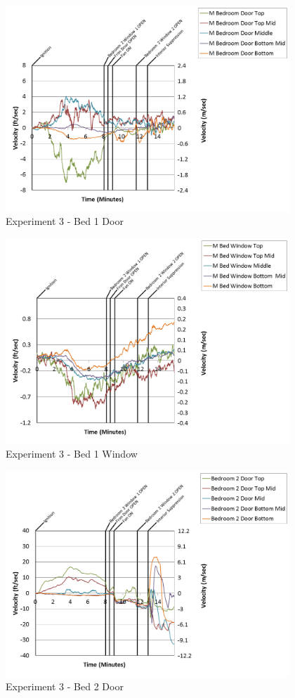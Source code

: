 \documentclass{article}
\begin{document}
\begin{appendices}
\clearpage

\begin{figure}[h!]
	\centering
	\includegraphics[height=3.05in]{0_Images/Results_Charts/Exp_3_Charts/Bed1Door.png}
	\caption{Experiment 3 - Bed 1 Door}
\end{figure}


\begin{figure}[h!]
	\centering
	\includegraphics[height=3.05in]{0_Images/Results_Charts/Exp_3_Charts/Bed1Window.png}
	\caption{Experiment 3 - Bed 1 Window}
\end{figure}

\clearpage

\begin{figure}[h!]
	\centering
	\includegraphics[height=3.05in]{0_Images/Results_Charts/Exp_3_Charts/Bed2Door.png}
	\caption{Experiment 3 - Bed 2 Door}
\end{figure}



\end{appendices}
\end{document}
